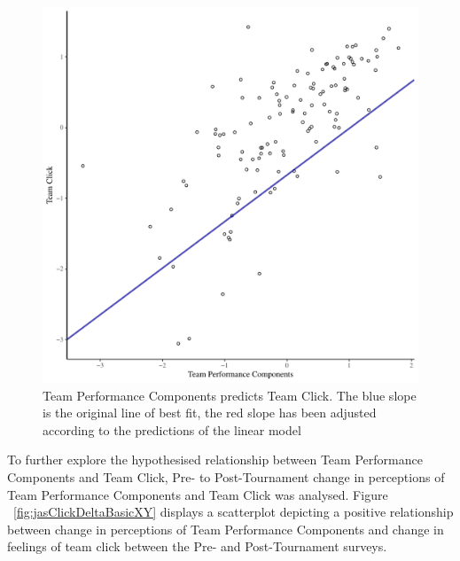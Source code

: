 \begin{CJK}{UTF8}{gbsn}
\begin{figure}[htbp]
  \centering
\includegraphics[scale = .5]{images/jasClickModelSlope}
  \caption{Team Performance Components predicts Team Click. The blue slope is the original line of best fit, the red slope has been adjusted according to the predictions of the linear model}
  \label{fig:jasClickModelSLope}
\end{figure}



To further explore the hypothesised relationship between Team Performance Components and Team Click, Pre- to Post-Tournament change in perceptions of Team Performance Components and Team Click was analysed.  Figure ~\ref{fig:jasClickDeltaBasicXY} displays a scatterplot depicting a positive relationship between change in perceptions of Team Performance Components and change in feelings of team click between the Pre- and Post-Tournament surveys.


\end{CJK}
